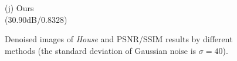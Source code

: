 \documentclass[runningheads]{llncs}
\begin{document}
\begin{figure}
{\begin{minipage}[t]{0.2\textwidth}
{\footnotesize (j) Ours \\(30.90dB/0.8328)}
\end{minipage}
}
\vspace{-0.2in}
\caption{Denoised images of \textsl{House} and PSNR/SSIM results by different methods (the standard deviation of Gaussian noise is $\sigma=40$).}
\label{fig5}
\end{figure}\vspace{-0.3in}

\begin{figure}
\centering
{}
\end{figure}
\end{document}
